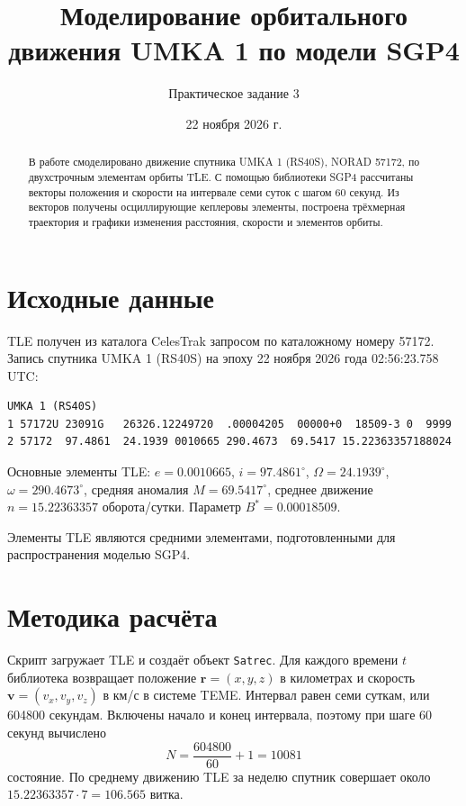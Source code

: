 \documentclass[12pt,a4paper]{article}
\title{Моделирование орбитального движения UMKA 1 по модели SGP4}
\author{Практическое задание 3}
\date{22 ноября 2026 г.}
\begin{document}
    \maketitle

    \begin{abstract}
        В работе смоделировано движение спутника UMKA 1 (RS40S), NORAD 57172, по двухстрочным
        элементам орбиты TLE. С помощью библиотеки SGP4 рассчитаны векторы положения и скорости на
        интервале семи суток с шагом 60 секунд. Из векторов получены осциллирующие кеплеровы
        элементы, построена трёхмерная траектория и графики изменения расстояния, скорости и
        элементов орбиты.
    \end{abstract}

    \section{Исходные данные}

    TLE получен из каталога CelesTrak запросом по каталожному номеру 57172. Запись спутника UMKA 1
    (RS40S) на эпоху 22 ноября 2026 года 02:56:23.758 UTC:

    \begin{verbatim}
UMKA 1 (RS40S)
1 57172U 23091G   26326.12249720  .00004205  00000+0  18509-3 0  9999
2 57172  97.4861  24.1939 0010665 290.4673  69.5417 15.22363357188024
    \end{verbatim}

    Основные элементы TLE: $e=0.0010665$, $i=97.4861^\circ$, $\Omega=24.1939^\circ$,
    $\omega=290.4673^\circ$, средняя аномалия $M=69.5417^\circ$, среднее движение $n=15.22363357$
    оборота/сутки. Параметр $B^*=0.00018509$.

    Элементы TLE являются средними элементами, подготовленными для распространения моделью SGP4.

    \section{Методика расчёта}

    Скрипт загружает TLE и создаёт объект \texttt{Satrec}. Для каждого времени $t$ библиотека
    возвращает положение $\mathbf r=(x,y,z)$ в километрах и скорость $\mathbf v=(v_x,v_y,v_z)$ в
    км/с в системе TEME. Интервал равен семи суткам, или 604800 секундам. Включены начало и конец
    интервала, поэтому при шаге 60 секунд вычислено
    \[
    N=\frac{604800}{60}+1=10081
    \]
    состояние. По среднему движению TLE за неделю спутник совершает около $15.22363357\cdot7=106.565$ витка.
\end{document}
